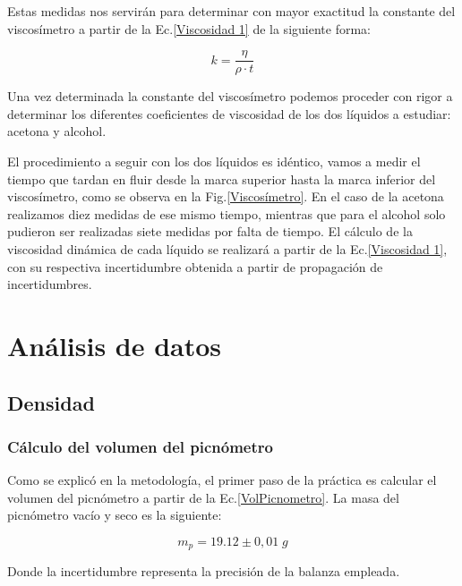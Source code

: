 \documentclass[a4paper,12pt,titlepage]{article}
\begin{document}
\par Estas medidas nos servirán para determinar con mayor exactitud la constante del viscosímetro a partir de la Ec.\ref{Viscosidad 1} de la siguiente forma:

\begin{equation}
    k = \frac{\eta}{\rho \cdot t}
    \label{Coef Viscosimetro}
\end{equation}

Una vez determinada la constante del viscosímetro podemos proceder con rigor a determinar los diferentes coeficientes de viscosidad de los dos líquidos a estudiar: acetona y alcohol.

\par El procedimiento a seguir con los dos líquidos es idéntico, vamos a medir el tiempo que tardan en fluir desde la marca superior hasta la marca inferior del viscosímetro, como se observa en la Fig.\ref{Viscosímetro}. En el caso de la acetona realizamos diez medidas de ese mismo tiempo, mientras que para el alcohol solo pudieron ser realizadas siete medidas por falta de tiempo. El cálculo de la viscosidad dinámica de cada líquido se realizará a partir de la Ec.\ref{Viscosidad 1}, con su respectiva incertidumbre obtenida a partir de propagación de incertidumbres.


\newpage

\section{Análisis de datos}

\subsection{Densidad}

\subsubsection{Cálculo del volumen del picnómetro}

Como se explicó en la metodología, el primer paso de la práctica es calcular el volumen del picnómetro a partir de la Ec.\ref{VolPicnometro}. La masa del picnómetro vacío y seco es la siguiente:

\begin{equation}
    m_{p} = 19.12 \pm 0,01 \; g
\end{equation}

Donde la incertidumbre representa la precisión de la balanza empleada.
\end{document}
